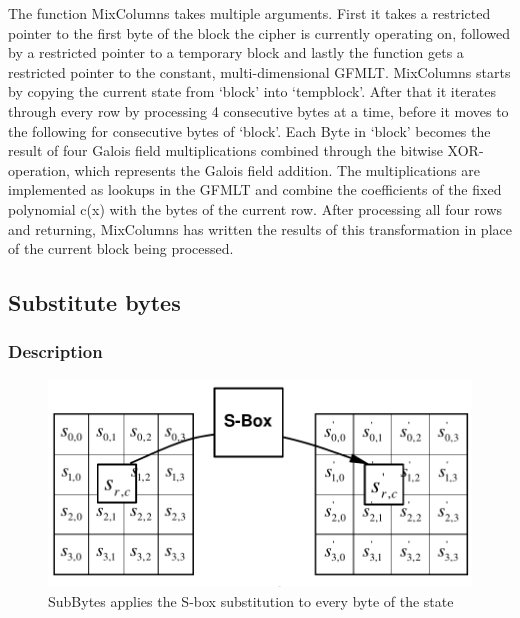 The function MixColumns takes multiple arguments. First it takes a
restricted pointer to the first byte of the block the cipher is
currently operating on, followed by a restricted pointer to a temporary
block and lastly the function gets a restricted pointer to the constant,
multi-dimensional GFMLT. MixColumns starts by copying the current state
from `block' into `tempblock'. After that it iterates through every row
by processing 4 consecutive bytes at a time, before it moves to the
following for consecutive bytes of `block'. Each Byte in `block' becomes
the result of four Galois field multiplications combined through the
bitwise XOR-operation, which represents the Galois field addition. The
multiplications are implemented as lookups in the GFMLT and combine the
coefficients of the fixed polynomial c(x) with the bytes of the current
row. After processing all four rows and returning, MixColumns has
written the results of this transformation in place of the current block
being processed.

\hypertarget{substitute-bytes}{%
\subsection{Substitute bytes}\label{substitute-bytes}}

\hypertarget{description-5}{%
\subsubsection{Description}\label{description-5}}

\begin{figure}
\centering
\includegraphics[scale = 0.3]{data/figures/subbytes.png}
\caption{SubBytes applies the S-box substitution to every byte of the
state}
\end{figure}

